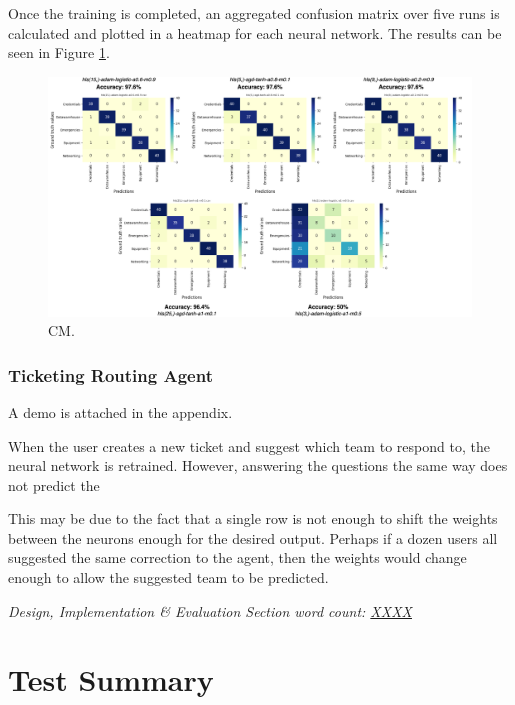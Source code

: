 \documentclass[letterpaper,12pt]{article}
\begin{document}
Once the training is completed, an aggregated confusion matrix over five runs is calculated and plotted in a heatmap for each neural network. The results can be seen in Figure \ref{fig:confusion_matrices}.

\begin{figure}[h] 
\centerline{\includegraphics[width=1.1\textwidth]{report/figures/confusion_matrices.png}}
\caption{\label{fig:confusion_matrices}CM.}
\end{figure}

\subsubsection{Ticketing Routing Agent}

A demo is attached in the appendix.

When the user creates a new ticket and suggest which team to respond to, the neural network is retrained. However, answering the questions the same way does not predict the 

This may be due to the fact that a single row is not enough to shift the weights between the neurons enough for the desired output. Perhaps if a dozen users all suggested the same correction to the agent, then the weights would change enough to allow the suggested team to be predicted.


\textit{Design, Implementation \& Evaluation Section word count: \underline{XXXX}}

\section{Test Summary}
\label{sec:test-summary}
\end{document}

